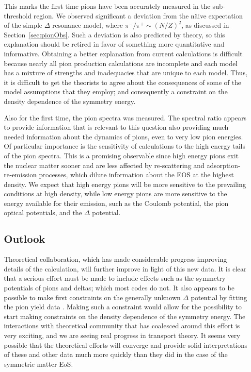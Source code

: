   This marks the first time pions have been accurately measured in the sub-threshold region. We observed significant a deviation from the  n\"aive expectation of the simple $\Delta$ resonance model, where $\pi^-/\pi^+ \sim (N/Z)^2$, as discussed in Section~\ref{sec:pionObs}. Such a deviation is also predicted by theory, so this explanation should be retired in favor of something more quantitative and informative. Obtaining a better explanation from current calculations is difficult because nearly all pion production calculations are incomplete and each model has a mixture of strengths and inadequacies that are unique to each model. Thus, it is difficult to get the theorists to agree about the consequences of some of the model assumptions that they employ; and consequently a constraint on the density dependence of the symmetry energy. 
  
  Also for the first time, the pion spectra was measured. The spectral ratio appears to provide information that is relevant to this question also providing much needed information about the dynamics of pions, even to very low pion energies. Of particular importance is the sensitivity of calculations to the high energy tails of the pion spectra. This is a promising observable since high energy pions  exit the nuclear matter sooner and are less affected by re-scattering and adsorption-re-emission processes, which dilute information about the EOS at the highest density. We expect that high energy pions will be more sensitive to the prevailing conditions at high density, while low energy pions are more sensitive to the energy available for their emission, such as the Coulomb potential, the pion optical potentials, and the $\Delta$ potential. 


\subsection{Outlook}
Theoretical collaboration, which has made considerable progress improving details of the calculation, will further improve in light of this new data. It is clear that a serious effort must be made to include effects such as the symmetry potentials of pions and deltas; which most codes do not. It also appears to be possible to make first constraints on the generally unknown $\Delta$ potential by fitting the pion yield data \cite{cozmaPC}. Making such a constraint would allow for the possibility to start making constraints on the density dependence of the symmetry energy. The interactions with theoretical community that has coalesced around this effort is very exciting, and we are seeing real progress in transport theory. It seems very possible that the theoretical efforts will converge and provide solid interpretations of these and other data much more quickly than they did in the case of the symmetric matter EoS. 

